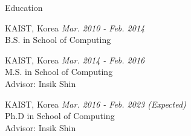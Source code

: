 
\begin{rSection}{Education}

KAIST, Korea \hfill {\em Mar. 2010 - Feb. 2014} \\
B.S. in School of Computing

KAIST, Korea \hfill {\em Mar. 2014 - Feb. 2016} \\
M.S. in School of Computing \\
Advisor: Insik Shin

KAIST, Korea \hfill {\em Mar. 2016 - Feb. 2023 (Expected)} \\
Ph.D in School of Computing \\
Advisor: Insik Shin

\end{rSection}

